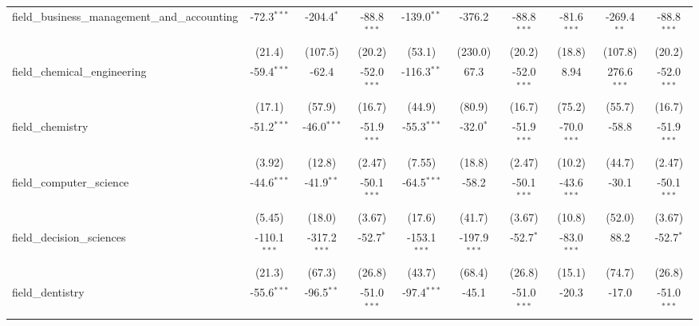 \begin{tabular}{lccccccccc}
   field\_business\_management\_and\_accounting                & -72.3$^{***}$  & -204.4$^{*}$   & -88.8$^{***}$ & -139.0$^{**}$  & -376.2         & -88.8$^{***}$ & -81.6$^{***}$  & -269.4$^{**}$  & -88.8$^{***}$\\   
                                                               & (21.4)         & (107.5)        & (20.2)        & (53.1)         & (230.0)        & (20.2)        & (18.8)         & (107.8)        & (20.2)\\   
   field\_chemical\_engineering                                & -59.4$^{***}$  & -62.4          & -52.0$^{***}$ & -116.3$^{**}$  & 67.3           & -52.0$^{***}$ & 8.94           & 276.6$^{***}$  & -52.0$^{***}$\\   
                                                               & (17.1)         & (57.9)         & (16.7)        & (44.9)         & (80.9)         & (16.7)        & (75.2)         & (55.7)         & (16.7)\\   
   field\_chemistry                                            & -51.2$^{***}$  & -46.0$^{***}$  & -51.9$^{***}$ & -55.3$^{***}$  & -32.0$^{*}$    & -51.9$^{***}$ & -70.0$^{***}$  & -58.8          & -51.9$^{***}$\\   
                                                               & (3.92)         & (12.8)         & (2.47)        & (7.55)         & (18.8)         & (2.47)        & (10.2)         & (44.7)         & (2.47)\\   
   field\_computer\_science                                    & -44.6$^{***}$  & -41.9$^{**}$   & -50.1$^{***}$ & -64.5$^{***}$  & -58.2          & -50.1$^{***}$ & -43.6$^{***}$  & -30.1          & -50.1$^{***}$\\   
                                                               & (5.45)         & (18.0)         & (3.67)        & (17.6)         & (41.7)         & (3.67)        & (10.8)         & (52.0)         & (3.67)\\   
   field\_decision\_sciences                                   & -110.1$^{***}$ & -317.2$^{***}$ & -52.7$^{*}$   & -153.1$^{***}$ & -197.9$^{***}$ & -52.7$^{*}$   & -83.0$^{***}$  & 88.2           & -52.7$^{*}$\\   
                                                               & (21.3)         & (67.3)         & (26.8)        & (43.7)         & (68.4)         & (26.8)        & (15.1)         & (74.7)         & (26.8)\\   
   field\_dentistry                                            & -55.6$^{***}$  & -96.5$^{**}$   & -51.0$^{***}$ & -97.4$^{***}$  & -45.1          & -51.0$^{***}$ & -20.3          & -17.0          & -51.0$^{***}$\\   

\end{tabular}
